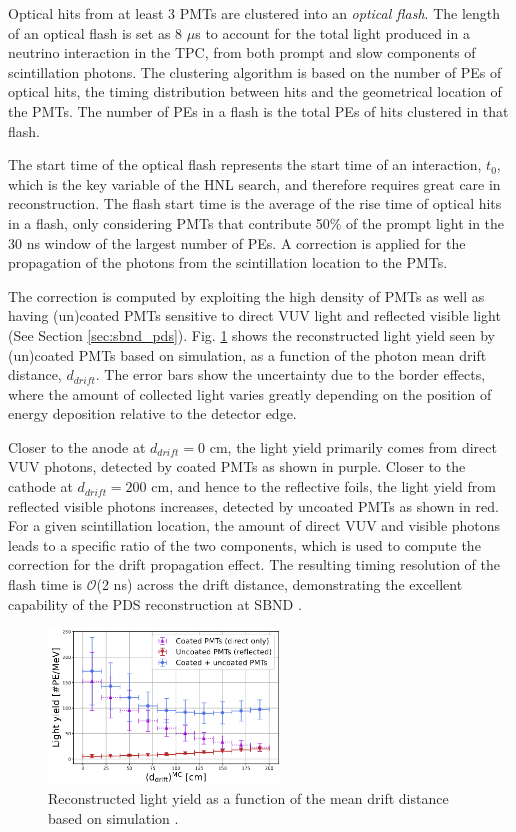 Optical hits from at least 3 PMTs are clustered into an \textit{optical flash}.
The length of an optical flash is set as 8 $\mu$s to account for the total light produced in a neutrino interaction in the TPC, from both prompt and slow components of scintillation photons.
The clustering algorithm is based on the number of PEs of optical hits, the timing distribution between hits and the geometrical location of the PMTs.
The number of PEs in a flash is the total PEs of hits clustered in that flash. 

The start time of the optical flash represents the start time of an interaction, $t_0$, which is the key variable of the HNL search, and therefore requires great care in reconstruction.
The flash start time is the average of the rise time of optical hits in a flash, only considering PMTs that contribute 50\% of the prompt light in the 30 ns window of the largest number of PEs.
A correction is applied for the propagation of the photons from the scintillation location to the PMTs.

The correction is computed by exploiting the high density of PMTs as well as having (un)coated PMTs sensitive to direct VUV light and reflected visible light (See Section \ref{sec:sbnd_pds}).
Fig. \ref{fig:light_yield_Diego} shows the reconstructed light yield seen by (un)coated PMTs based on simulation, as a function of the photon mean drift distance, $d_{drift}$.
The error bars show the uncertainty due to the border effects, where the amount of collected light varies greatly depending on the position of energy deposition relative to the detector edge.

Closer to the anode at $d_{drift} = 0 $ cm, the light yield primarily comes from direct VUV photons, detected by coated PMTs as shown in purple.
Closer to the cathode at $d_{drift} = 200 $ cm, and hence to the reflective foils, the light yield from reflected visible photons increases, detected by uncoated PMTs as shown in red.
For a given scintillation location, the amount of direct VUV and visible photons leads to a specific ratio of the two components, which is used to compute the correction for the drift propagation effect.
The resulting timing resolution of the flash time is $\mathcal{O}$(2 ns) across the drift distance, demonstrating the excellent capability of the PDS reconstruction at SBND \cite{sbnd_pds_paper}.

\begin{figure}[hb!]
\centering    
\includegraphics[width=0.55\textwidth]{light_yield_sim}
\caption[Reconstructed Light Yield at SBND]{
Reconstructed light yield as a function of the mean drift distance based on simulation \cite{sbnd_pds_paper}. 
}
\label{fig:light_yield_Diego}
\end{figure}


